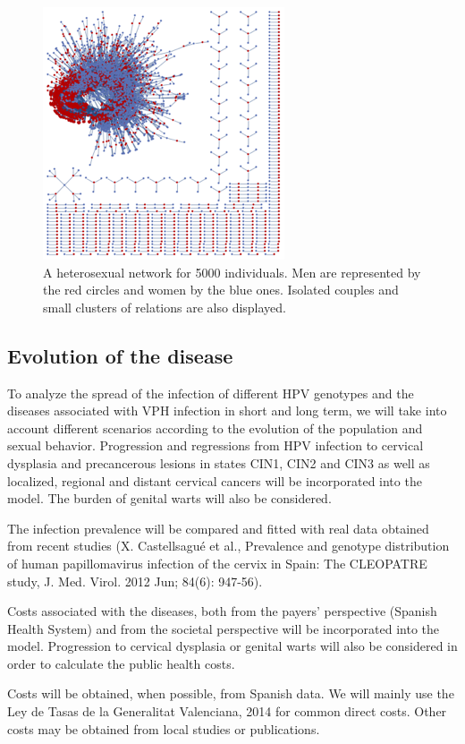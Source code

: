 \begin{figure}[ht]
	\centering
	\includegraphics[scale=0.7]{IMG/red1.png}
	\caption{A heterosexual network for 5000 individuals. Men are represented by the red circles and women by the blue ones. Isolated couples and small clusters of relations are also displayed.}
	\label{red1}
\end{figure}  

\subsection{Evolution of the disease}
To analyze the spread of the infection of different HPV genotypes and the diseases associated with VPH infection in short and long term, we will take into account different scenarios according to the evolution of the population and sexual behavior. Progression and regressions from HPV infection to cervical dysplasia and precancerous lesions in states CIN1, CIN2 and CIN3 as well as localized, regional and distant cervical cancers will be incorporated into the model.  The burden of genital warts will also be considered.

The infection prevalence will be compared and fitted with real data obtained from recent studies (X. Castellsagu\'e et al., Prevalence and genotype distribution of human papillomavirus infection of the cervix in Spain: The CLEOPATRE study, J. Med. Virol. 2012 Jun; 84(6): 947-56). 

Costs associated with the diseases, both from the payers' perspective (Spanish Health System) and from the societal perspective will be incorporated into the model. Progression to cervical dysplasia or genital warts will also be considered in order to calculate the public health costs.
 
Costs will be obtained, when possible, from Spanish data. We will mainly use the Ley de Tasas de la Generalitat Valenciana, 2014 for common direct costs. Other costs may be obtained from local studies or publications.

